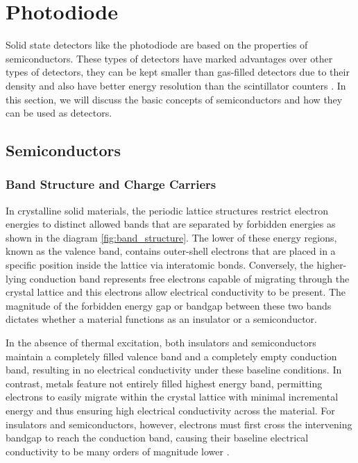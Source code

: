 \section{Photodiode}

Solid state detectors like the photodiode are based on the properties of semiconductors. These types of detectors have marked advantages over other types of detectors, they can be kept smaller than gas-filled detectors due to their density and also have better energy resolution than the scintillator counters \cite[Chap 11.]{knollRadiationDetectionMeasurement2010}. In this section, we will discuss the basic concepts of semiconductors and how they can be used as detectors.

\subsection{Semiconductors}
\subsubsection{Band Structure and Charge Carriers}

In crystalline solid materials, the periodic lattice structures restrict electron energies to distinct allowed bands that are separated by forbidden energies as shown in the diagram \cref{fig:band_structure}. The lower of these energy regions, known as the valence band, contains outer-shell electrons that are placed in a specific position inside the lattice via interatomic bonds. Conversely, the higher-lying conduction band represents free electrons capable of migrating through the crystal lattice and this electrons allow  electrical conductivity to be present. The magnitude of the forbidden energy gap or bandgap between these two bands dictates whether a material functions as an insulator or a semiconductor. 

In the absence of thermal excitation, both insulators and semiconductors maintain a completely filled valence band and a completely empty conduction band, resulting in no electrical conductivity under these baseline conditions. In contrast, metals feature not entirely filled highest energy band, permitting electrons to easily migrate within the crystal lattice with minimal incremental energy and thus ensuring high electrical conductivity across the material. For insulators and semiconductors, however, electrons must first cross the intervening bandgap to reach the conduction band, causing their baseline electrical conductivity to be many orders of magnitude lower \cite[Chap 11.]{knollRadiationDetectionMeasurement2010}.

